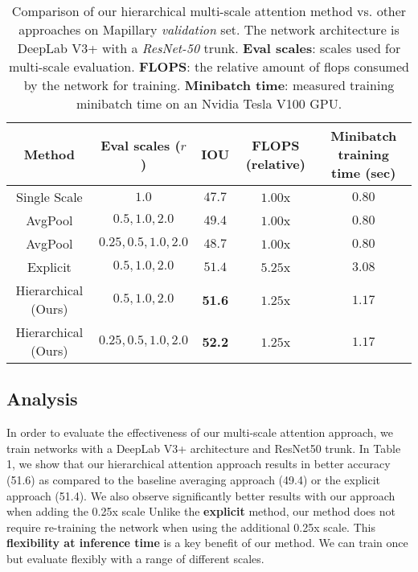 \documentclass{article}
\begin{document}
 
 
\begin{table}[htb!]
\centering
\begin{tabular}{|c|c|c|c|c|}
\hline
\textbf{Method}     & \textbf{Eval scales ($r$)} & \textbf{IOU} & \textbf{FLOPS (relative)} & \textbf{Minibatch training time (sec)}\\ \hline
Single Scale      & $1.0$         & $47.7$           & $1.00$x  & $0.80$ \\ \hline
AvgPool      & $0.5,1.0,2.0$         & $49.4$           & $1.00$x  & $0.80$ \\ \hline
AvgPool      & $0.25,0.5,1.0,2.0$     & $48.7$           & $1.00$x  & $0.80$ \\ \hline
Explicit   & $0.5,1.0,2.0$          & $51.4$           & $5.25$x  & $3.08$ \\ \hline
Hierarchical (Ours)         & $0.5,1.0,2.0$          & \textbf{51.6}  & $1.25$x & $1.17$ \\ \hline
Hierarchical (Ours)         & $0.25,0.5,1.0,2.0$     & \textbf{52.2}  & $1.25$x  & $1.17$\\ \hline
\end{tabular}

\caption{Comparison of our hierarchical multi-scale attention method vs. other approaches on Mapillary \textit{validation} set. The network architecture is DeepLab V3+ with a \textit{ResNet-50} trunk. \textbf{Eval scales}: scales used for multi-scale evaluation. \textbf{FLOPS}: the relative amount of flops consumed by the network for training. \textbf{Minibatch time}: measured training minibatch time on an Nvidia Tesla V100 GPU.}
\end{table}
\subsection{Analysis}

In order to evaluate the effectiveness of our multi-scale attention approach, we train networks with a DeepLab V3+ architecture and ResNet50 trunk. In Table 1, we show that our hierarchical attention approach results in better accuracy (51.6) as compared to the baseline averaging approach (49.4) or the explicit approach (51.4). We also observe significantly better results with our approach when adding the 0.25x scale Unlike the \textbf{explicit} method, our method does not require re-training the network when using the additional 0.25x scale. This \textbf{flexibility at inference time} is a key benefit of our method. We can train once but evaluate flexibly with a range of different scales.
\end{document}
